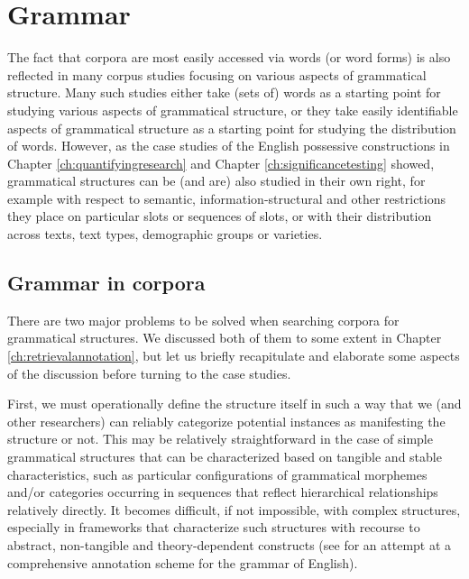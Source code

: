 \chapter{Grammar}
\label{ch:grammar}

The fact that corpora are most easily accessed via words (or word forms) is also reflected in many corpus studies focusing on various aspects of grammatical structure. Many such studies either take (sets of) words as a starting point for studying various aspects of grammatical structure, or they take easily identifiable aspects of grammatical structure as a starting point for studying the distribution of words. However, as the case studies of the English possessive constructions in Chapter \ref{ch:quantifyingresearch} and Chapter \ref{ch:significancetesting} showed, grammatical structures can be (and are) also studied in their own right, for example with respect to semantic, information-structural and other restrictions they place on particular slots or sequences of slots, or with their distribution across texts, text types, demographic groups or varieties.

\section{Grammar in corpora}
\label{sec:grammarincorpora}

There are two major problems to be solved when searching corpora for grammatical structures. We discussed both of them to some extent in Chapter \ref{ch:retrievalannotation}, but let us briefly recapitulate and elaborate some aspects of the discussion before turning to the case studies.

First, we must operationally define the structure itself in such a way that we (and other researchers) can reliably categorize potential instances as manifesting the structure or not. This may be relatively straightforward in the case of simple grammatical structures that can be characterized based on tangible and stable characteristics, such as particular configurations of grammatical morphemes and/or categories occurring in sequences that reflect hierarchical relationships relatively directly. It becomes difficult, if not impossible, with complex structures, especially in frameworks that characterize such structures with recourse to abstract, non-tangible and theory-dependent constructs (see \citet{sampson_english_1995} for an attempt at a comprehensive annotation scheme for the grammar of English).

